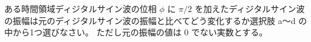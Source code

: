 ある時間領域ディジタルサイン波の位相 $\phi$ に $\pi/2$ を加えたディジタルサイン波の振幅は元のディジタルサイン波の振幅と比べてどう変化するか選択肢 a〜d の中から1つ選びなさい。
ただし元の振幅の値は $0$ でない実数とする。
